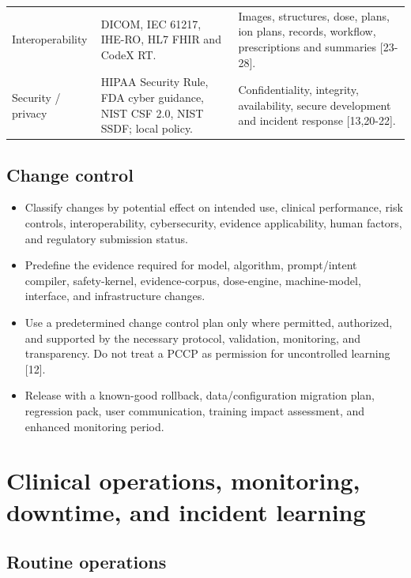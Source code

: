 \documentclass[11pt,letterpaper]{article}
\begin{document}
\begin{small}
\begin{longtable}{@{}L{0.1622\textwidth}L{0.3892\textwidth}L{0.3686\textwidth}@{}}
\addlinespace[2pt]
Interoperability & DICOM, IEC 61217, IHE-RO, HL7 FHIR and CodeX RT. & Images, structures, dose, plans, ion plans, records, workflow, prescriptions and summaries [23-28]. \\
\addlinespace[2pt]
Security \slash\allowbreak{} privacy & HIPAA Security Rule, FDA cyber guidance, NIST CSF 2.0, NIST SSDF; local policy. & Confidentiality, integrity, availability, secure development and incident response [13,20-22]. \\
\end{longtable}
\end{small}

\subsection{Change control}

\begin{itemize}
\item Classify changes by potential effect on intended use, clinical performance, risk controls, interoperability, cybersecurity, evidence applicability, human factors, and regulatory submission status.
\item Predefine the evidence required for model, algorithm, prompt\slash\allowbreak{}intent compiler, safety-kernel, evidence-corpus, dose-engine, machine-model, interface, and infrastructure changes.
\item Use a predetermined change control plan only where permitted, authorized, and supported by the necessary protocol, validation, monitoring, and transparency. Do not treat a PCCP as permission for uncontrolled learning [12].
\item Release with a known-good rollback, data\slash\allowbreak{}configuration migration plan, regression pack, user communication, training impact assessment, and enhanced monitoring period.
\end{itemize}

\section{Clinical operations, monitoring, downtime, and incident learning}

\subsection{Routine operations}
\end{document}
